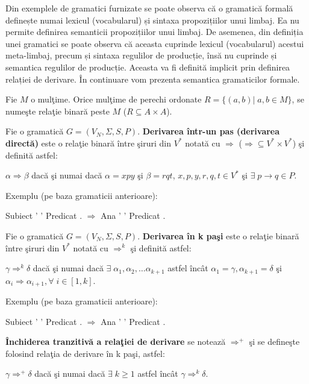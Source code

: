 Din exemplele de gramatici furnizate se poate observa că o gramatică formală definește numai lexicul (vocabularul) și sintaxa propozițiilor unui limbaj. Ea nu permite definirea semanticii propozițiilor unui limbaj. De asemenea, din definiția unei gramatici se poate observa că aceasta cuprinde lexicul (vocabularul) acestui meta-limbaj, precum și sintaxa regulilor de producție, însă nu cuprinde și semantica regulilor de producție. Aceasta va fi definită implicit prin definirea relației de derivare. În continuare vom prezenta semantica gramaticilor formale.

Fie $M$ o mulţime. Orice mulţime de perechi ordonate $R = \{ (a, b)| \; a,b \in M \}$, se numeşte relaţie binară peste $M$ ($R \subseteq A \times A$).

\begin{definitie}
Fie o gramatică $G = (V_{N}, \Sigma, S, P)$. \textbf{Derivarea într-un pas (derivarea directă)} este o relaţie binară între şiruri din $V^{*}$ notată cu $\Rightarrow$ ($\Rightarrow \subseteq V^{*} \times V^{*}$) şi definită astfel:

$\alpha \Rightarrow \beta$ dacă şi numai dacă $\alpha = xpy$ şi $\beta = rqt$, $x,p,y,r,q,t \in V^{*}$ şi $\exists \; p \rightarrow q \in P$.
\end{definitie}

Exemplu (pe baza gramaticii anterioare):

Subiect ' ' Predicat . $\Rightarrow$ Ana ' ' Predicat .

\begin{definitie}
Fie o gramatică $G = (V_{N}, \Sigma, S, P)$. \textbf{Derivarea în k paşi} este o relaţie binară între şiruri din $V^{*}$ notată cu $\Rightarrow^{k}$ şi definită astfel:

$\gamma \Rightarrow^{k} \delta$ dacă şi numai dacă $\exists \; \alpha_{1}, \alpha_{2}, \dots \alpha_{k+1}$ astfel încât $\alpha_{1} = \gamma, \alpha_{k+1} = \delta$ şi $\alpha_{i} \Rightarrow \alpha_{i+1}, \forall \; i \in [1,k]$.
\end{definitie}

Exemplu (pe baza gramaticii anterioare):

Subiect ' ' Predicat . $\Rightarrow$ Ana ' ' Predicat .

\begin{definitie}
\textbf{Închiderea tranzitivă a relaţiei de derivare} se notează $\Rightarrow^{+}$ şi se defineşte folosind relaţia de derivare în k paşi, astfel:

$\gamma \Rightarrow^{+} \delta$ dacă şi  numai dacă $\exists \; k \geq 1$ astfel încât $\gamma \Rightarrow^{k} \delta$.
\end{definitie}

